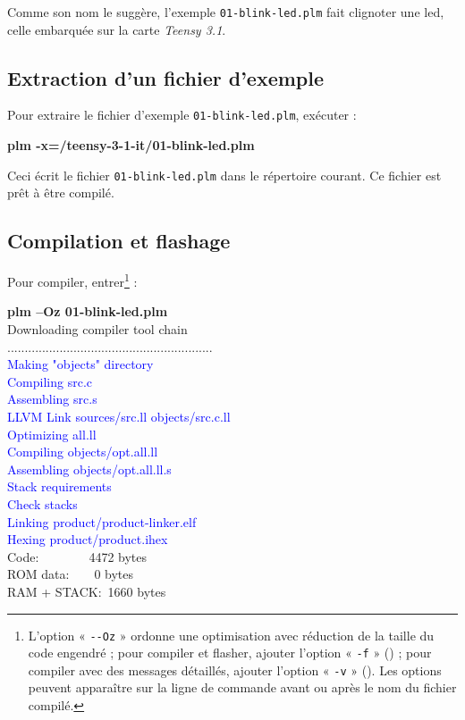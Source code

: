 Comme son nom le suggère, l'exemple \texttt{01-blink-led.plm} fait clignoter une led, celle embarquée sur la carte \emph{Teensy 3.1}.

\subsection{Extraction d'un fichier d'exemple}

Pour extraire le fichier d'exemple \texttt{01-blink-led.plm}, exécuter :

\begin{SHELL}
\bfseries plm -x=/teensy-3-1-it/01-blink-led.plm
\end{SHELL}


Ceci écrit le fichier \texttt{01-blink-led.plm} dans le répertoire courant. Ce fichier est prêt à être compilé.

\subsection{Compilation et flashage}

Pour compiler, entrer\footnote{L'option « \texttt{-{}-Oz} » ordonne une optimisation avec réduction de la taille du code engendré ; pour compiler et flasher, ajouter l'option « \texttt{-f} » () ; pour compiler avec des messages détaillés, ajouter l'option « \texttt{-v} » (). Les options peuvent apparaître sur la ligne de commande avant ou après le nom du fichier compilé.} :
\begin{SHELL}
{\bfseries plm --Oz 01-blink-led.plm}\\
Downloading compiler tool chain\\
...........................................................\\
\textcolor{blue}{Making "objects" directory}\\
\textcolor{blue}{Compiling src.c}\\
\textcolor{blue}{Assembling src.s}\\
\textcolor{blue}{LLVM Link sources/src.ll objects/src.c.ll}\\
\textcolor{blue}{Optimizing all.ll}\\
\textcolor{blue}{Compiling objects/opt.all.ll}\\
\textcolor{blue}{Assembling objects/opt.all.ll.s}\\
\textcolor{blue}{Stack requirements}\\
\textcolor{blue}{Check stacks}\\
\textcolor{blue}{Linking product/product-linker.elf}\\
\textcolor{blue}{Hexing product/product.ihex}\\
Code:~~~~~~~~4472 bytes\\
ROM data:~~~~0 bytes\\
RAM + STACK:~1660 bytes\\
\end{SHELL}

